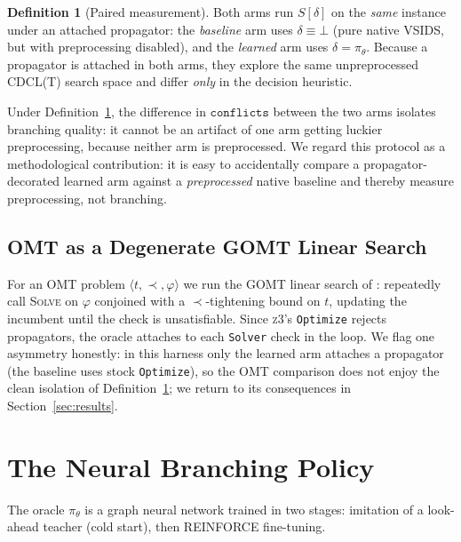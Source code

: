 \documentclass[letterpaper]{article} %
\theoremstyle{definition}
\newtheorem{definition}{Definition}
\theoremstyle{plain}
\theoremstyle{remark}
\newcommand{\solver}{\textsc{z3}}
\newcommand{\defer}{\bot}
\newcommand{\policy}{\pi_\theta}
\newcommand{\confl}{\texttt{conflicts}}
\begin{document}
\begin{definition}[Paired measurement]
\label{def:pairing}
Both arms run $S[\delta]$ on the \emph{same} instance under an attached
propagator: the \emph{baseline} arm uses $\delta\equiv\defer$ (pure native
VSIDS, but with preprocessing disabled), and the \emph{learned} arm uses
$\delta=\policy$. Because a propagator is attached in both arms, they explore
the same unpreprocessed \textsc{CDCL(T)} search space and differ \emph{only}
in the decision heuristic.
\end{definition}

Under Definition~\ref{def:pairing}, the difference in $\confl$ between the two
arms isolates branching quality: it cannot be an artifact of one arm getting
luckier preprocessing, because neither arm is preprocessed. We regard this
protocol as a methodological contribution: it is easy to accidentally compare
a propagator-decorated learned arm against a \emph{preprocessed} native
baseline and thereby measure preprocessing, not branching.

\subsection{OMT as a Degenerate GOMT Linear Search}
\label{sec:omt}

For an OMT problem $\langle t,\prec,\varphi\rangle$ we run the GOMT linear
search of \citet{gomt2024}: repeatedly call \textsc{Solve} on $\varphi$
conjoined with a $\prec$-tightening bound on $t$, updating the incumbent
until the check is unsatisfiable. Since \solver{}'s \texttt{Optimize} rejects
propagators, the oracle attaches to each \texttt{Solver} check in the loop.
We flag one asymmetry honestly: in this harness only the learned arm attaches
a propagator (the baseline uses stock \texttt{Optimize}), so the OMT
comparison does not enjoy the clean isolation of
Definition~\ref{def:pairing}; we return to its consequences in
Section~\ref{sec:results}.

\section{The Neural Branching Policy}
\label{sec:policy}

The oracle $\policy$ is a graph neural network trained in two stages:
imitation of a look-ahead teacher (cold start), then REINFORCE fine-tuning.
\end{document}
